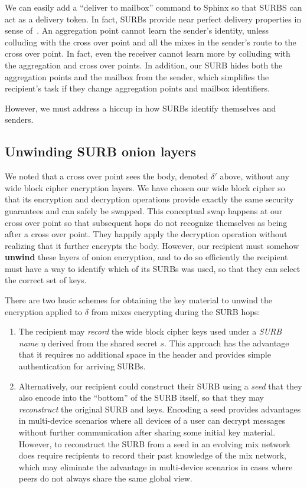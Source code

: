 \documentclass[twoside,letterpaper]{llncs}
\begin{document}
We can easily add a ``deliver to mailbox'' command to Sphinx so that
SURBS can act as a delivery token.  In fact, SURBs provide near
perfect delivery properties in sense of~\cite{warner-delivery}.
An aggregation point cannot learn the sender's identity, unless
colluding with the cross over point and all the mixes in the 
sender's route to the cross over point.  
In fact, even the receiver cannot learn more by colluding with
the aggregation and cross over points.  In addition, our SURB
hides both the aggregation points and the mailbox from the sender,
which simplifies the recipient's task if they change aggregation
points and mailbox identifiers.

However, we must address a hiccup in how SURBs identify themselves
and senders.

\subsection{Unwinding SURB onion layers}

We noted that a cross over point sees the body, denoted $\delta'$
above, without any wide block cipher encryption layers.  We have
chosen our wide block cipher so that its encryption and decryption
operations provide exactly the same security guarantees and can
safely be swapped.  This conceptual swap happens at our cross over
point so that subsequent hops do not recognize themselves as being
after a cross over point.  They happily apply the decryption
operation without realizing that it further encrypts the body.
However, our recipient must somehow {\bf unwind} these layers of
onion encryption, and to do so efficiently the recipient must have
a way to identify which of its SURBs was used, so that they
can select the correct set of keys.

There are two basic schemes for obtaining the key material to
unwind the encryption applied to $\delta$ from mixes encrypting
during the SURB hops:

\begin{enumerate}
 \item The recipient may {\em record} the wide block cipher keys used
   under a {\it SURB name} $\eta$ derived from the shared secret $s$.
   This approach has the advantage that it requires no additional
   space in the header and provides simple authentication for arriving
   SURBs.

 \item Alternatively, our recipient could construct their SURB using a
   {\em seed} that they also encode into the ``bottom'' of the SURB
   itself, so that they may {\em reconstruct} the original SURB and
   keys.  Encoding a seed provides advantages in multi-device
   scenarios where all devices of a user can decrypt messages without
   further communication after sharing some initial key material.
   However, to reconstruct the SURB from a seed in an evolving mix
   network does require recipients to record their past knowledge of
   the mix network, which may eliminate the advantage in multi-device
   scenarios in cases where peers do not always share the same global
   view.
\end{enumerate}
\end{document}
